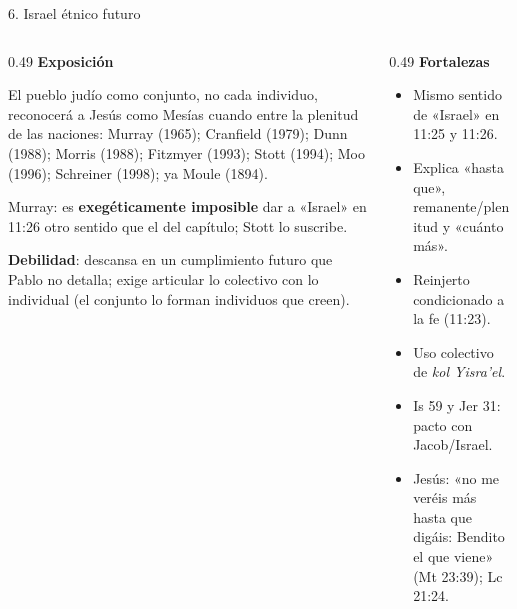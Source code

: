 \begin{frame}{6. Israel étnico futuro}
\begin{columns}[T,onlytextwidth]
\begin{column}{0.49\textwidth}\small\RaggedRight
\textbf{\textcolor{cafe}{Exposición}}\par
El pueblo judío como conjunto, no cada individuo, reconocerá a Jesús como Mesías cuando entre la plenitud de las naciones: Murray (1965); Cranfield (1979); Dunn (1988); Morris (1988); Fitzmyer (1993); Stott (1994); Moo (1996); Schreiner (1998); ya Moule (1894).\par\smallskip
{\scriptsize Murray: es \textbf{exegéticamente imposible} dar a «Israel» en 11:26 otro sentido que el del capítulo; Stott lo suscribe.}\par\smallskip
\textbf{\textcolor{cafe}{Debilidad}}: descansa en un cumplimiento futuro que Pablo no detalla; exige articular lo colectivo con lo individual (el conjunto lo forman individuos que creen).
\end{column}
\begin{column}{0.49\textwidth}\scriptsize\RaggedRight
\textbf{\textcolor{ladrillo}{Fortalezas}}
\begin{itemize}
\item Mismo sentido de «Israel» en 11:25 y 11:26.
\item Explica «hasta que», remanente/plenitud y «cuánto más».
\item Reinjerto condicionado a la fe (11:23).
\item Uso colectivo de \emph{kol Yisra'el}.
\item Is 59 y Jer 31: pacto con Jacob/Israel.
\item Jesús: «no me veréis más hasta que digáis: Bendito el que viene» (Mt 23:39); Lc 21:24.
\end{itemize}
\end{column}
\end{columns}
\end{frame}

